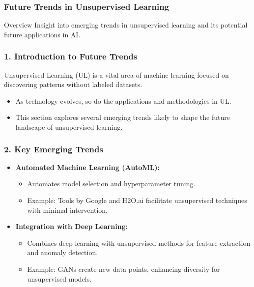 \documentclass[aspectratio=169]{beamer}
\begin{document}
\begin{frame}
    \frametitle{Future Trends in Unsupervised Learning}
    \begin{block}{Overview}
        Insight into emerging trends in unsupervised learning and its potential future applications in AI.
    \end{block}
\end{frame}

\begin{frame}
    \frametitle{1. Introduction to Future Trends}
    Unsupervised Learning (UL) is a vital area of machine learning focused on discovering patterns without labeled datasets. 
    \begin{itemize}
        \item As technology evolves, so do the applications and methodologies in UL.
        \item This section explores several emerging trends likely to shape the future landscape of unsupervised learning.
    \end{itemize}
\end{frame}

\begin{frame}
    \frametitle{2. Key Emerging Trends}
    \begin{itemize}
        \item \textbf{Automated Machine Learning (AutoML):}
        \begin{itemize}
            \item Automates model selection and hyperparameter tuning.
            \item Example: Tools by Google and H2O.ai facilitate unsupervised techniques with minimal intervention.
        \end{itemize}

        \item \textbf{Integration with Deep Learning:}
        \begin{itemize}
            \item Combines deep learning with unsupervised methods for feature extraction and anomaly detection.
            \item Example: GANs create new data points, enhancing diversity for unsupervised models.
        \end{itemize}
    \end{itemize}
\end{frame}
\end{document}
